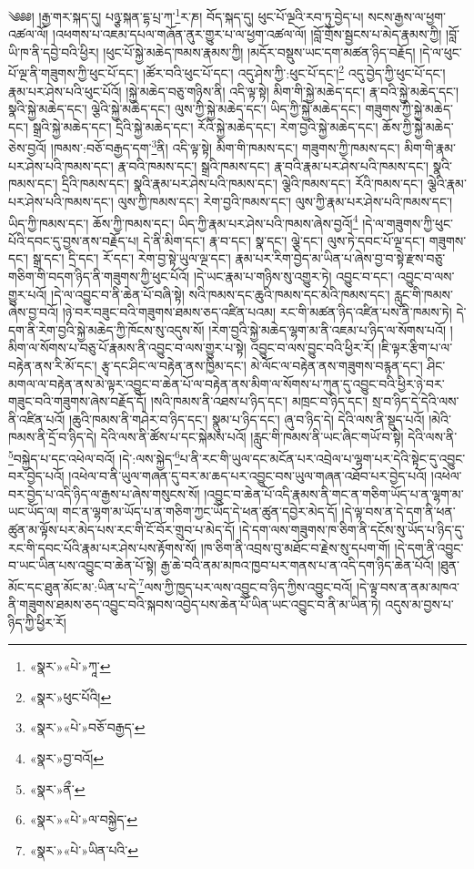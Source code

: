 ༄༅༅། །རྒྱ་གར་སྐད་དུ། པཉྩ་སྐན་དྷ་པྲ་ཀ་\footnote{«སྣར་»«པེ་»ཀཱ་}ར་ཎ། བོད་སྐད་དུ། ཕུང་པོ་ལྔའི་རབ་ཏུ་བྱེད་པ། སངས་རྒྱས་ལ་ཕྱག་འཚལ་ལོ། །འཕགས་པ་འཇམ་དཔལ་གཞོན་ནུར་གྱུར་པ་ལ་ཕྱག་འཚལ་ལོ། །བློ་གྲོས་སྦྱངས་པ་མེད་རྣམས་ཀྱི། །བློ་ཡི་ཁ་ནི་དབྱེ་བའི་ཕྱིར། །ཕུང་པོ་སྐྱེ་མཆེད་ཁམས་རྣམས་ཀྱི། །མདོར་བསྡུས་ཡང་དག་མཚན་ཉིད་བརྗོད། །དེ་ལ་ཕུང་པོ་ལྔ་ནི་གཟུགས་ཀྱི་ཕུང་པོ་དང་། །ཚོར་བའི་ཕུང་པོ་དང་། འདུ་ཤེས་ཀྱི་:ཕུང་པོ་དང་།\footnote{«སྣར་»ཕུང་པོའི།} འདུ་བྱེད་ཀྱི་ཕུང་པོ་དང་། རྣམ་པར་ཤེས་པའི་ཕུང་པོའོ། །སྐྱེ་མཆེད་བཅུ་གཉིས་ནི། འདི་ལྟ་སྟེ། མིག་གི་སྐྱེ་མཆེད་དང་། རྣ་བའི་སྐྱེ་མཆེད་དང་། སྣའི་སྐྱེ་མཆེད་དང་། ལྕེའི་སྐྱེ་མཆེད་དང་། ལུས་ཀྱི་སྐྱེ་མཆེད་དང་། ཡིད་ཀྱི་སྐྱེ་མཆེད་དང་། གཟུགས་ཀྱི་སྐྱེ་མཆེད་དང་། སྒྲའི་སྐྱེ་མཆེད་དང་། དྲིའི་སྐྱེ་མཆེད་དང་། རོའི་སྐྱེ་མཆེད་དང་། རེག་བྱའི་སྐྱེ་མཆེད་དང་། ཆོས་ཀྱི་སྐྱེ་མཆེད་ཅེས་བྱའོ། །ཁམས་:བཅོ་བརྒྱད་དག་\footnote{«སྣར་»«པེ་»བཅོ་བརྒྱད་}ནི། འདི་ལྟ་སྟེ། མིག་གི་ཁམས་དང་། གཟུགས་ཀྱི་ཁམས་དང་། མིག་གི་རྣམ་པར་ཤེས་པའི་ཁམས་དང་། རྣ་བའི་ཁམས་དང་། སྒྲའི་ཁམས་དང་། རྣ་བའི་རྣམ་པར་ཤེས་པའི་ཁམས་དང་། སྣའི་ཁམས་དང་། དྲིའི་ཁམས་དང་། སྣའི་རྣམ་པར་ཤེས་པའི་ཁམས་དང་། ལྕེའི་ཁམས་དང་། རོའི་ཁམས་དང་། ལྕེའི་རྣམ་པར་ཤེས་པའི་ཁམས་དང་། ལུས་ཀྱི་ཁམས་དང་། རེག་བྱའི་ཁམས་དང་། ལུས་ཀྱི་རྣམ་པར་ཤེས་པའི་ཁམས་དང་། ཡིད་ཀྱི་ཁམས་དང་། ཆོས་ཀྱི་ཁམས་དང་། ཡིད་ཀྱི་རྣམ་པར་ཤེས་པའི་ཁམས་ཞེས་བྱའོ།\footnote{«སྣར་»བྱ་བའོ།} །དེ་ལ་གཟུགས་ཀྱི་ཕུང་པོའི་དབང་དུ་བྱས་ནས་བརྗོད་པ། དེ་ནི་མིག་དང་། རྣ་བ་དང་། སྣ་དང་། ལྕེ་དང་། ལུས་ཏེ་དབང་པོ་ལྔ་དང་། གཟུགས་དང་། སྒྲ་དང་། དྲི་དང་། རོ་དང་། རེག་བྱ་སྟེ་ཡུལ་ལྔ་དང་། རྣམ་པར་རིག་བྱེད་མ་ཡིན་པ་ཞེས་བྱ་བ་སྟེ་རྫས་བཅུ་གཅིག་གི་བདག་ཉིད་ནི་གཟུགས་ཀྱི་ཕུང་པོའོ། །དེ་ཡང་རྣམ་པ་གཉིས་སུ་འགྱུར་ཏེ། འབྱུང་བ་དང་། འབྱུང་བ་ལས་གྱུར་པའོ། །དེ་ལ་འབྱུང་བ་ནི་ཆེན་པོ་བཞི་སྟེ། སའི་ཁམས་དང་ཆུའི་ཁམས་དང་མེའི་ཁམས་དང་། རླུང་གི་ཁམས་ཞེས་བྱ་བའོ། །ཉེ་བར་བཟུང་བའི་གཟུགས་ཐམས་ཅད་འཛིན་པའམ། རང་གི་མཚན་ཉིད་འཛིན་པས་ནི་ཁམས་ཏེ། དེ་དག་ནི་རེག་བྱའི་སྐྱེ་མཆེད་ཀྱི་ཁོངས་སུ་འདུས་སོ། །རེག་བྱའི་སྐྱེ་མཆེད་ལྷག་མ་ནི་འཇམ་པ་ཉིད་ལ་སོགས་པའོ། །མིག་ལ་སོགས་པ་བཅུ་པོ་རྣམས་ནི་འབྱུང་བ་ལས་གྱུར་པ་སྟེ། འབྱུང་བ་ལས་བྱུང་བའི་ཕྱིར་རོ། །ཇི་ལྟར་རྩིག་པ་ལ་བརྟེན་ནས་རི་མོ་དང་། རྩྭ་དང་ཤིང་ལ་བརྟེན་ནས་ཁྱིམ་དང་། མེ་ལོང་ལ་བརྟེན་ནས་གཟུགས་བརྙན་དང་། ཤིང་མགལ་ལ་བརྟེན་ནས་མེ་ལྟར་འབྱུང་བ་ཆེན་པོ་ལ་བརྟེན་ནས་མིག་ལ་སོགས་པ་ཀུན་དུ་འབྱུང་བའི་ཕྱིར་ཉེ་བར་གཟུང་བའི་གཟུགས་ཞེས་བརྗོད་དོ། །སའི་ཁམས་ནི་འཐས་པ་ཉིད་དང་། མཁྲང་བ་ཉིད་དང་། སྲ་བ་ཉིད་དེ་དེའི་ལས་ནི་འཛིན་པའོ། །ཆུའི་ཁམས་ནི་གཤེར་བ་ཉིད་དང་། སྣུམ་པ་ཉིད་དང་། ཞུ་བ་ཉིད་དེ། དེའི་ལས་ནི་སྡུད་པའོ། །མེའི་ཁམས་ནི་དྲོ་བ་ཉིད་དེ། དེའི་ལས་ནི་ཚོས་པ་དང་སྐེམས་པའོ། །རླུང་གི་ཁམས་ནི་ཡང་ཞིང་གཡོ་བ་སྟེ། དེའི་ལས་ནི་\footnote{«སྣར་»ནྀ་}བསྐྱེད་པ་དང་འཕེལ་བའོ། །དེ་:ལས་སྐྱེད་\footnote{«སྣར་»«པེ་»ལ་བསྐྱེད་}པ་ནི་རང་གི་ཡུལ་དང་མངོན་པར་འབྲེལ་པ་ལྷག་པར་དེའི་སྟེང་དུ་འབྱུང་བར་བྱེད་པའོ། །འཕེལ་བ་ནི་ཡུལ་གཞན་དུ་བར་མ་ཆད་པར་འབྱུང་བས་ཡུལ་གཞན་འཐོབ་པར་བྱེད་པའོ། །འཕེལ་བར་བྱེད་པ་འདི་ཉིད་ལ་རྒྱས་པ་ཞེས་གསུངས་སོ། །འབྱུང་བ་ཆེན་པོ་འདི་རྣམས་ནི་གང་ན་གཅིག་ཡོད་པ་ན་ལྷག་མ་ཡང་ཡོད་ལ། གང་ན་ལྷག་མ་ཡོད་པ་ན་གཅིག་ཀྱང་ཡོད་དེ་ཕན་ཚུན་དབྱེར་མེད་དོ། །དེ་ལྟ་བས་ན་དེ་དག་ནི་ཕན་ཚུན་མ་ལྟོས་པར་མེད་པས་རང་གི་ངོ་བོར་གྲུབ་པ་མེད་དོ། །དེ་དག་ལས་གཟུགས་ཁ་ཅིག་ནི་དངོས་སུ་ཡོད་པ་ཉིད་དུ་རང་གི་དབང་པོའི་རྣམ་པར་ཤེས་པས་རྟོགས་སོ། །ཁ་ཅིག་ནི་འབྲས་བུ་མཐོང་བ་རྗེས་སུ་དཔག་གོ། །དེ་དག་ནི་འབྱུང་བ་ཡང་ཡིན་པས་འབྱུང་བ་ཆེན་པོ་སྟེ། རྒྱ་ཆེ་བའི་ནམ་མཁའ་ཁྱབ་པར་གནས་པ་ན་འདི་དག་ཉིད་ཆེན་པོའོ། །ཐུན་མོང་དང་ཐུན་མོང་མ་:ཡིན་པ་དེ་\footnote{«སྣར་»«པེ་»ཡིན་པའི་}ལས་ཀྱི་ཁྱད་པར་ལས་འབྱུང་བ་ཉིད་ཀྱིས་འབྱུང་བའོ། །དེ་ལྟ་བས་ན་ནམ་མཁའ་ནི་གཟུགས་ཐམས་ཅད་འབྱུང་བའི་སྐབས་འབྱེད་པས་ཆེན་པོ་ཡིན་ཡང་འབྱུང་བ་ནི་མ་ཡིན་ཏེ། འདུས་མ་བྱས་པ་ཉིད་ཀྱི་ཕྱིར་རོ། 